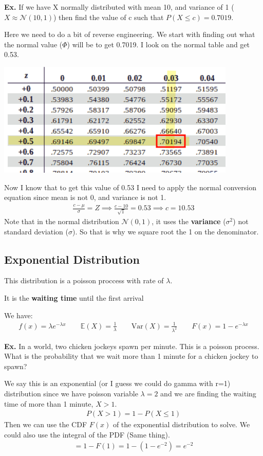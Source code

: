 \documentclass[12pt,letterpaper]{article} \usepackage{amsmath} \usepackage{graphicx} \usepackage[margin=1in]{geometry} \usepackage{longtable}  \usepackage{amssymb}
\begin{document}
	\begin{mdframed}
		\textbf{Ex. }If we have X normally distributed with mean 10, and variance of 1 ($X\approx \mathcal N(10,1)$) then find the value of c such that $P(X\le c) = 0.7019$.
		
		Here we need to do a bit of reverse engineering. We start with finding out what the normal value ($\Phi$) will be to get 0.7019. I look on the normal table and get 0.53.
		\begin{center}
			\includegraphics[width=0.5\linewidth]{normal-ex1}
		\end{center}
		Now I know that to get this value of 0.53 I need to apply the normal conversion equation since mean is not 0, and variance is not 1. 
		\begin{align*}
			\frac{c-\mu}{\sigma} = Z \implies \frac{c-10}{\sqrt{1}} = 0.53 \implies c = 10.53
		\end{align*}
		Note that in the normal distribution $\mathcal N(0,1)$, it uses the \textbf{variance} ($\sigma^2$) not standard deviation ($\sigma$). So that is why we square root the 1 on the denominator.
		
	\end{mdframed}
	
	\subsection{Exponential Distribution}
	This distribution is a poisson proccess with rate of $\lambda$.
	
	It is the \textbf{waiting time} until the first arrival
	
	We have:
	\begin{align*}
		f(x) = \lambda e^{-\lambda x}  \qquad \mathbb E(X)=\frac{1}{\lambda} \qquad \text{Var}(X) = \frac{1}{\lambda^2} \qquad F(x) = 1-e^{-\lambda x}
	\end{align*}

	\begin{mdframed}
		\textbf{Ex.} In a world, two chicken jockeys spawn per minute. This is a poisson process. What is the probability that we wait more than 1 minute for a chicken jockey to spawn?
		
		We say this is an exponential (or I guess we could do gamma with r=1) distribution since we have poisson variable $\lambda = 2$ and we are finding the waiting time of more than 1 minute, $X>1$.
		\begin{align*}
			P(X>1) = 1-P(X\le 1)
		\end{align*}
		Then we can use the CDF $F(x)$ of the exponential distribution to solve. We could also use the integral of the PDF (Same thing).
		\begin{align*}
			=1-F(1) = 1-(1-e^{-2}) = e^{-2}
		\end{align*}
	\end{mdframed}
	
\end{document}

